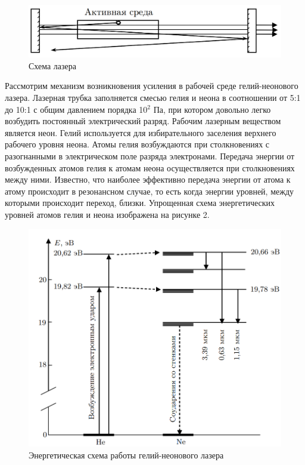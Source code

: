 \documentclass[a4paper,12pt]{article} %
\begin{document}
	\begin{figure}[h!]
		\centering
		\includegraphics[scale=0.55]{Pictures/Схема Лазера}
		\caption{Схема лазера}
	\end{figure}

	Рассмотрим механизм возникновения усиления в рабочей среде гелий-неонового лазера. Лазерная трубка заполняется смесью гелия и неона в соотношении от 5:1 до 10:1 с общим давлением порядка 10$^2$ Па, при котором довольно легко возбудить постоянный электрический разряд. Рабочим лазерным веществом является неон. Гелий используется для избирательного заселения верхнего рабочего уровня неона. Атомы гелия возбуждаются при столкновениях с разогнанными в электрическом поле разряда электронами. Передача энергии от возбужденных атомов гелия к атомам неона осуществляется при столкновениях между ними. Известно, что наиболее эффективно передача энергии от атома к атому происходит в резонансном случае, то есть когда энергии уровней, между которыми происходит переход, близки. Упрощенная схема энергетических уровней атомов гелия и неона изображена на рисунке 2.
	
	\begin{figure}[h!]
		\centering
		\includegraphics[scale=0.6]{Pictures/Переход}
		\caption{Энергетическая схема работы гелий-неонового лазера}
	\end{figure}
	
\end{document}
